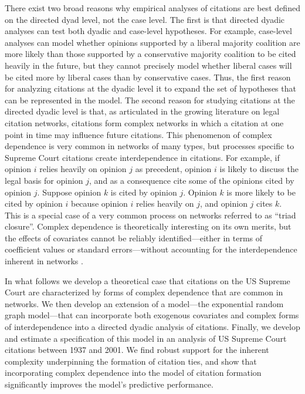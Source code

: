 \documentclass[headsepline=true, abstracton]{scrartcl}
\begin{document}
There exist two broad reasons why empirical analyses of citations are best defined on the directed dyad level, not the case level. The first is that directed dyadic analyses can test both dyadic and case-level hypotheses. For example, case-level analyses can model whether opinions supported by a liberal majority coalition are more likely than those supported by a conservative majority coalition to be cited heavily in the future, but they cannot precisely model whether liberal cases will be cited more by liberal cases than by conservative cases. Thus, the first reason for analyzing citations at the dyadic level it to expand the set of hypotheses that can be represented in the model. The second reason for studying citations at the directed dyadic level is that, as articulated in the growing literature on legal citation networks, citations form complex networks in which a citation at one point in time may influence future citations. This phenomenon of complex dependence is very common in networks of many types, but processes specific to Supreme Court citations create interdependence in citations. For example, if opinion $i$ relies heavily on opinion $j$ as precedent, opinion $i$ is likely to discuss the legal basis for opinion $j$, and as a consequence cite some of the opinions cited by opinion $j$. Suppose opinion $k$ is cited by opinion $j$. Opinion $k$ is more likely to be cited by opinion $i$ because opinion $i$ relies heavily on $j$, and opinion $j$ cites $k$.  This is a special case of a very common process on networks referred to as ``triad closure''. Complex dependence is theoretically interesting on its own merits, but the effects of covariates cannot be reliably identified---either in terms of coefficient values or standard errors---without accounting for the interdependence inherent in networks \citep{desmaraisstatistical}. 

In what follows we develop a theoretical case that citations on the US Supreme Court are characterized by forms of complex dependence that are common in networks. We then develop an extension of a model---the exponential random graph model---that can incorporate both exogenous covariates and complex forms of interdependence into a directed dyadic analysis of citations. Finally, we develop and estimate a specification of this model in an analysis of US Supreme Court citations between 1937 and 2001. We find robust support for the inherent complexity underpinning the formation of citation ties, and show that incorporating complex dependence into the model of citation formation significantly improves the model's predictive performance.
\end{document}
